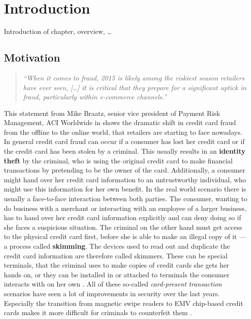 
\chapter{Introduction} %
\label{cha:introduction}

Introduction of chapter, overview, \ldots

\section{Motivation}
\label{sec:motivation}

\begin{quotation}
  \textit{\enquote{When it comes to fraud, 2015 is likely among the riskiest season retailers have ever seen, […]
  it is critical that they prepare for a significant uptick in fraud, particularly within e-commerce channels.}}
\end{quotation}
This statement from Mike Braatz, senior vice president of Payment Risk Management, ACI Worldwide in \citep{Reuters2015}
shows the dramatic shift in credit card fraud from the offline to the online world, that retailers are starting to face
nowadays. \\

In general credit card fraud can occur if a consumer has lost her credit card or if the credit card has been stolen
by a criminal. This usually results in an \textbf{identity theft} by the criminal, who is using the original credit card
to make financial transactions by pretending to be the owner of the card. Additionally, a consumer might hand over her
credit card information to an untrustworthy individual, who might use this information for her own benefit.
In the real world scenario there is usually a face-to-face interaction between both parties.
The consumer, wanting to do business with a merchant or interacting with an employee of a larger business, has to hand over
her credit card information explicitly and can deny doing so if she faces a suspicious situation.
The criminal on the other hand must get access to the physical credit card first, before she is able to make an
illegal copy of it --- a process called \textbf{skimming}. The devices used to read out and duplicate the credit card
information are therefore called skimmers. These can be special terminals, that the criminal uses to make copies of
credit cards she gets her hands on, or they can be installed in or attached to terminals the consumer interacts with on her own
\citep{ConsumerAction2009}. All of these so-called \textit{card-present transaction} scenarios have seen a lot of improvements in security
over the last years. Especially the transition from magnetic swipe readers to EMV chip-based credit cards makes it more difficult
for criminals to counterfeit them \citep{Lewis2015}. \\

